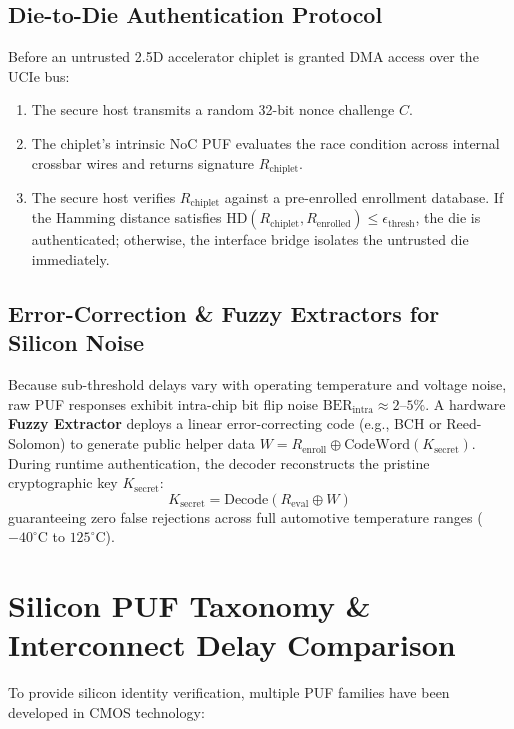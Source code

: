 \subsection{Die-to-Die Authentication Protocol}
Before an untrusted 2.5D accelerator chiplet is granted DMA access over the UCIe bus:
\begin{enumerate}
    \item The secure host transmits a random 32-bit nonce challenge $C$.
    \item The chiplet's intrinsic NoC PUF evaluates the race condition across internal crossbar wires and returns signature $R_{\mathrm{chiplet}}$.
    \item The secure host verifies $R_{\mathrm{chiplet}}$ against a pre-enrolled enrollment database. If the Hamming distance satisfies $\mathrm{HD}(R_{\mathrm{chiplet}}, R_{\mathrm{enrolled}}) \le \epsilon_{\mathrm{thresh}}$, the die is authenticated; otherwise, the interface bridge isolates the untrusted die immediately.
\end{enumerate}

\subsection{Error-Correction \& Fuzzy Extractors for Silicon Noise}
Because sub-threshold delays vary with operating temperature and voltage noise, raw PUF responses exhibit intra-chip bit flip noise $\mathrm{BER}_{\mathrm{intra}} \approx 2\text{--}5\%$. A hardware \textbf{Fuzzy Extractor} deploys a linear error-correcting code (e.g., BCH or Reed-Solomon) to generate public helper data $W = R_{\mathrm{enroll}} \oplus \mathrm{CodeWord}(K_{\mathrm{secret}})$. During runtime authentication, the decoder reconstructs the pristine cryptographic key $K_{\mathrm{secret}}$:
\begin{equation}
K_{\mathrm{secret}} = \mathrm{Decode}(R_{\mathrm{eval}} \oplus W)
\end{equation}
guaranteeing zero false rejections across full automotive temperature ranges ($-40^\circ\mathrm{C}$ to $125^\circ\mathrm{C}$).

\section{Silicon PUF Taxonomy \& Interconnect Delay Comparison}
\label{sec:puf-taxonomy}

To provide silicon identity verification, multiple PUF families have been developed in CMOS technology:

